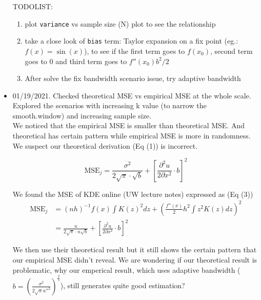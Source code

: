 \documentclass{article}
\begin{document}
\begin{itemize}
TODOLIST:
\begin{enumerate}
\item plot \texttt{variance} vs sample size (N) plot to see the relationship
\item take a close look of \texttt{bias} term: Taylor expansion on a fix point (eg.: $f(x) = \sin(x)$), to see if the first term goes to $f(x_0)$, second term goes to 0 and third term goes to $f''(x_0)b^2/2$
\item After solve the fix bandwidth scenario issue, try adaptive bandwidth
\end{enumerate}




\item 01/19/2021. Checked theoretical MSE vs empirical MSE at the whole scale. Explored the scenarios with increasing k value (to narrow the smooth.window) and increasing sample size.\\
We noticed that the empirical MSE is smaller than theoretical MSE. And theoretical has certain pattern while empirical MSE is more in randomness. We suspect our theoretical derivation (Eq (1)) is incorrect. 

\begin{equation}
         \text{MSE}_j=  \frac{\sigma^2}{2\sqrt{\pi} \cdot \sqrt{b}}  + \left[\frac{\partial^2 u}{2\partial x^2}\cdot b \right]^2
\end{equation}

We found the MSE of KDE online (UW lecture notes) expressed as (Eq (3))
\begin{align}
         \text{MSE}_j &= (nh)^{-1}f(x)\int K(z)^2 dz + \left(\frac{f''(x)}{2} h^2 \int z^2K(z)dz \right)^2 \\
         &= \frac{u}{2\sqrt{\pi} \cdot n\sqrt{b}}  + \left[\frac{\partial^2 u}{2\partial x^2}\cdot b \right]^2
\end{align}

We then use their theoretical result but it still shows the certain pattern that our empirical MSE didn't reveal. We are wondering if our theoretical result is problematic, why our emperical result, which uses adaptive bandwidth ($b =\left(\frac{\sigma^2}{2\sqrt{\pi} u''^2}\right)^{\frac{2}{5}} $), still generates quite good estimation?



\end{itemize}
\end{document}
